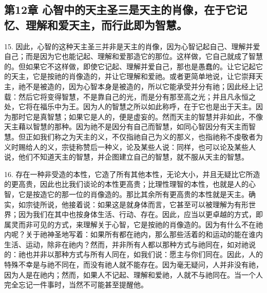 
\subsection{第12章 心智中的天主圣三是天主的肖像，在于它记忆、理解和爱天主，而行此即为智慧。}

15. 因此，心智的这种天主圣三并非是天主的肖像，因为心智记起自己、理解并爱自己；而是因为它也能记起、理解和爱那造它的那位。这样做，它自己就成了智慧的。但如果它不这样做，即使它记起、理解并爱自己，那也是愚蠢的。让它记起它的天主，它是按祂的肖像造的，并让它理解和爱祂。或者更简单地说，让它崇拜天主，祂不是被造的，因为心智本身是被造的，所以它能承受并分有祂；因此经上记载：然后它将变得智慧，不是靠自己的光，而是分有那至高之光；并且凡永恒之处，它将在福乐中为王。因为人的智慧之所以如此称呼，在于它也是出于天主。因为那时它是真智慧；如果它是人的，便是虚妄的。然而天主的智慧并非如此，不像天主藉以智慧的那种。因为祂不是因分有自己而智慧，如同心智因分有天主而智慧。但正如我们称之为天主的义，不仅指祂自己为义的那义，也指祂称不虔敬者为义时赐给人的义，宗徒称赞后一种义，论及某些人说：同样，也可以论及某些人说，他们不知道天主的智慧，并企图建立自己的智慧，就不服从天主的智慧。\par

16. 存在一种非受造的本性，它造了所有其他本性，无论大小，并且无疑比它所造的更高贵，因此也比我们谈论的本性更高贵；比理性理智的本性，也就是人的心智，它是按造它的那一位的肖像造的。那比其余所有更高贵的本性就是天主。确实，如宗徒所说，他接着说：如果这是就身体而言，它甚至可以被理解为有形世界；因为我们在其中也按身体生活、行动、存在。因此，应当以更卓越的方式，即属灵而非可见的方式，来理解关于心智，它是按祂的肖像造的。因为有什么不在祂内呢？关于祂神圣地写着：如果所有都在祂内，那么那些活着的和运动的能在谁内生活、运动，除非在祂内？然而，并非所有人都以那种方式与祂同在，如对祂说的：祂也并非以那种方式与所有人同在，如我们说：愿主与你们同在。因此，人的特殊不幸是与祂不同在，而没有祂人就不能存在。因为毫无疑问，人并非没有祂，因为人是在祂内；然而，如果人不记起、理解和爱祂，人就不与祂同在。当一个人完全忘记一件事时，当然不可能甚至提醒他。\par



